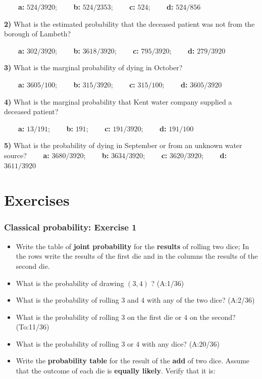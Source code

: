 \documentclass[
]{book}
\begin{document}
\textbf{\(\qquad\)a:} \(524/3920\); \textbf{\(\qquad\)b:} \(524/2353\); \textbf{\(\qquad\)c:} \(524\); \textbf{\(\qquad\)d:} \(524/856\)

\textbf{2)} What is the estimated probability that the deceased patient was not from the borough of Lambeth?

\textbf{\(\qquad\)a:} \(302/3920\); \textbf{\(\qquad\)b:} \(3618/3920\); \textbf{\(\qquad\)c:} \(795/3920\); \textbf{\(\qquad\)d:} \(279/3920\)

\textbf{3)} What is the marginal probability of dying in October?

\textbf{\(\qquad\)a:} \(3605/100\); \textbf{\(\qquad\)b:} \(315/3920\); \textbf{\(\qquad\)c:} \(315/100\); \textbf{\(\qquad\)d:} \(3605/3920\)

\textbf{4)} What is the marginal probability that Kent water company supplied a deceased patient?

\textbf{\(\qquad\)a:} \(13/191\); \textbf{\(\qquad\)b:} \(191\); \textbf{\(\qquad\)c:} \(191/3920\); \textbf{\(\qquad\)d:} \(191/100\)

\textbf{5)} What is the probability of dying in September or from an unknown water source?
\textbf{\(\qquad\)a:} \(3680/3920\); \textbf{\(\qquad\)b:} \(3634/3920\); \textbf{\(\qquad\)c:} \(3620/3920\); \textbf{\(\qquad\)d:} \(3611/3920\)

\hypertarget{exercises-1}{%
\section{Exercises}\label{exercises-1}}

\hypertarget{classical-probability-exercise-1}{%
\subsubsection{Classical probability: Exercise 1}\label{classical-probability-exercise-1}}

\begin{itemize}
\item
  Write the table of \textbf{joint probability} for the \textbf{results} of rolling two dice; In the rows write the results of the first die and in the columns the results of the second die.
\item
  What is the probability of drawing \((3, 4)\) ? (A:1/36)
\item
  What is the probability of rolling \(3\) and \(4\) with any of the two dice? (A:2/36)
\item
  What is the probability of rolling \(3\) on the first die or \(4\) on the second? (To:11/36)
\item
  What is the probability of rolling \(3\) or \(4\) with any dice? (A:20/36)
\item
  Write the \textbf{probability table} for the result of the \textbf{add} of two dice. Assume that the outcome of each die is \textbf{equally likely}. Verify that it is:
\end{itemize}
\end{document}
